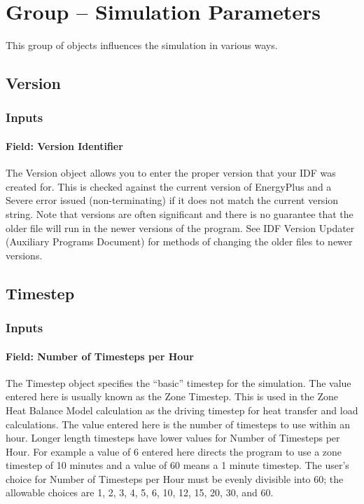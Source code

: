 \section{Group -- Simulation Parameters}\label{group-simulation-parameters}

This group of objects influences the simulation in various ways.

\subsection{Version}\label{version}

\subsubsection{Inputs}\label{inputs-044}

\paragraph{Field: Version Identifier}\label{field-version-identifier}

The Version object allows you to enter the proper version that your IDF was created for. This is checked against the current version of EnergyPlus and a Severe error issued (non-terminating) if it does not match the current version string. Note that versions are often significant and there is no guarantee that the older file will run in the newer versions of the program. See IDF Version Updater (Auxiliary Programs Document) for methods of changing the older files to newer versions.

\subsection{Timestep}\label{timestep}

\subsubsection{Inputs}\label{inputs-1-041}

\paragraph{Field: Number of Timesteps per Hour}\label{field-number-of-timesteps-per-hour}

The Timestep object specifies the ``basic'' timestep for the simulation. The value entered here is usually known as the Zone Timestep. This is used in the Zone Heat Balance Model calculation as the driving timestep for heat transfer and load calculations. The value entered here is the number of timesteps to use within an hour. Longer length timesteps have lower values for Number of Timesteps per Hour. For example a value of 6 entered here directs the program to use a zone timestep of 10 minutes and a value of 60 means a 1 minute timestep. The user's choice for Number of Timesteps per Hour must be evenly divisible into 60; the allowable choices are 1, 2, 3, 4, 5, 6, 10, 12, 15, 20, 30, and 60.


